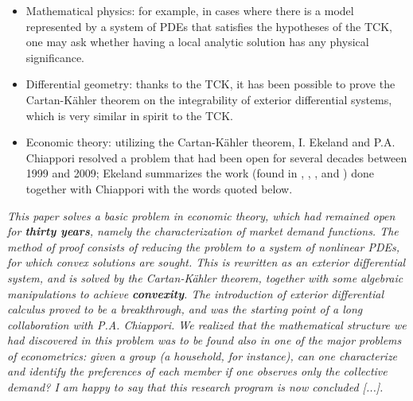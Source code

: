 \begin{itemize}
\item Mathematical physics: for example, in cases where there is a model represented by a system of PDEs that satisfies the hypotheses of the TCK, one may ask whether having a local analytic solution has any physical significance.
\item Differential geometry: thanks to the TCK, it has been possible to prove the Cartan-Kähler theorem on the integrability of exterior differential systems, which is very similar in spirit to the TCK.
\item Economic theory: utilizing the Cartan-Kähler theorem, I. Ekeland and P.A. Chiappori resolved a problem that had been open for several decades between 1999 and 2009; Ekeland summarizes the work (found in \cite{CE}, \cite{CEgenchar}, \cite{CEaggregation}, and \cite{CEid}) done together with Chiappori with the words quoted below.
\end{itemize}

\textit{This paper solves a basic problem in economic theory, which had remained open for \textbf{thirty years}, namely the characterization of market demand functions. The method of proof consists of reducing the problem to a system of nonlinear PDEs, for which convex solutions are sought. This is rewritten as an exterior differential system, and is solved by the Cartan-Kähler theorem, together with some algebraic manipulations to achieve \textbf{convexity}. The introduction of exterior differential calculus proved to be a breakthrough, and was the starting point of a long collaboration with P.A. Chiappori. We realized that the mathematical structure we had discovered in this problem was to be found also in one of the major problems of econometrics: given a group (a household, for instance), can one characterize and identify the preferences of each member if one observes only the collective demand? I am happy to say that this research program is now concluded [...].}

\newpage
\blankpage
